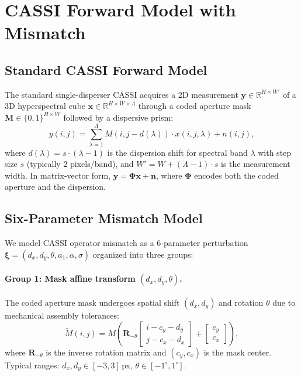 \documentclass[runningheads]{llncs}
\begin{document}
\section{CASSI Forward Model with Mismatch}
\label{sec:forward}

\subsection{Standard CASSI Forward Model}
\label{sec:standard}

The standard single-disperser CASSI acquires a 2D measurement $\mathbf{y} \in \mathbb{R}^{H \times W'}$ of a 3D hyperspectral cube $\mathbf{x} \in \mathbb{R}^{H \times W \times \Lambda}$ through a coded aperture mask $\mathbf{M} \in \{0,1\}^{H \times W}$ followed by a dispersive prism:
\begin{equation}
    y(i, j) = \sum_{\lambda=1}^{\Lambda} M(i, j - d(\lambda)) \cdot x(i, j, \lambda) + n(i, j),
    \label{eq:cassi_forward}
\end{equation}
where $d(\lambda) = s \cdot (\lambda - 1)$ is the dispersion shift for spectral band $\lambda$ with step size $s$ (typically 2 pixels/band), and $W' = W + (\Lambda - 1) \cdot s$ is the measurement width.
In matrix-vector form, $\mathbf{y} = \mathbf{\Phi}\mathbf{x} + \mathbf{n}$, where $\mathbf{\Phi}$ encodes both the coded aperture and the dispersion.

\subsection{Six-Parameter Mismatch Model}
\label{sec:mismatch}

We model CASSI operator mismatch as a 6-parameter perturbation $\boldsymbol{\xi} = (d_x, d_y, \theta, a_1, \alpha, \sigma)$ organized into three groups:

\paragraph{Group 1: Mask affine transform $(d_x, d_y, \theta)$.}
The coded aperture mask undergoes spatial shift $(d_x, d_y)$ and rotation $\theta$ due to mechanical assembly tolerances:
\begin{equation}
    \tilde{M}(i,j) = M\!\left(\mathbf{R}_{-\theta}\begin{bmatrix}i - c_y - d_y \\ j - c_x - d_x\end{bmatrix} + \begin{bmatrix}c_y \\ c_x\end{bmatrix}\right),
    \label{eq:mask_warp}
\end{equation}
where $\mathbf{R}_{-\theta}$ is the inverse rotation matrix and $(c_y, c_x)$ is the mask center.
Typical ranges: $d_x, d_y \in [-3, 3]$\,px, $\theta \in [-1^\circ, 1^\circ]$.
\end{document}
